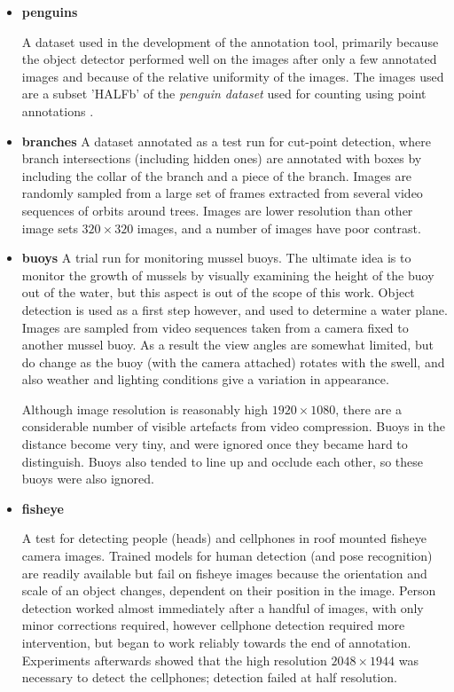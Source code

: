 \begin{itemize}
    \item{\bf{penguins}}\par
A dataset used in the development of the annotation tool, primarily because the object detector performed well on the images after only a few annotated images and because of the relative uniformity of the images. The images used are a subset 'HALFb'  of the \emph{penguin dataset} \cite{PenguinData} used for counting using point annotations \cite{Arteta2016}. 
    \item{\bf{branches}}
A dataset annotated as a test run for cut-point detection, where branch intersections (including hidden ones) are annotated with boxes by including the collar of the branch and a piece of the branch. Images are randomly sampled from a large set of frames extracted from several video sequences of orbits around trees. Images are lower resolution than other image sets $ 320\times320 $ images, and a number of images have poor contrast.

    \item{\bf{buoys}}
A trial run for monitoring mussel buoys. The ultimate idea is to monitor the growth of mussels by visually examining the height of the buoy out of the water, but this aspect is out of the scope of this work. Object detection is used as a first step however, and used to determine a water plane. Images are sampled from video sequences taken from a camera fixed to another mussel buoy. As a result the view angles are somewhat limited, but do change as the buoy (with the camera attached) rotates with the swell, and also weather and lighting conditions give a variation in appearance. 

Although image resolution is reasonably high $1920\times1080$, there are a considerable number of visible artefacts from video compression. Buoys in the distance become very tiny, and were ignored once they became hard to distinguish. Buoys also tended to line up and occlude each other, so these buoys were also ignored.


    \item{\bf{fisheye}}
    
A test for detecting people (heads) and cellphones in roof mounted fisheye camera images. Trained models for human detection (and pose recognition) are readily available but fail on fisheye images because the orientation and scale of an object changes, dependent on their position in the image. Person detection worked almost immediately after a handful of images, with only minor corrections required, however cellphone detection required more intervention, but began to work reliably towards the end of annotation. Experiments afterwards showed that the high resolution $2048\times1944$ was necessary to detect the cellphones; detection failed at half resolution.


\end{itemize}
